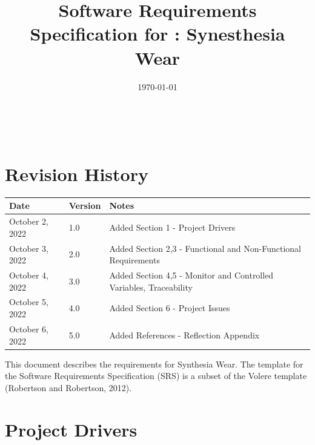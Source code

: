 \documentclass[12pt]{article}
\begin{document}
\title{Software Requirements Specification for \progname: Synesthesia Wear} 
\author{\authname}
\date{\today}
	
\maketitle

~\newpage


\tableofcontents

\pagebreak

\section*{Revision History}

\begin{tabularx}{\textwidth}{p{3cm}p{2cm}X}
\toprule {\bf Date} & {\bf Version} & {\bf Notes}\\
\midrule
October 2, 2022 & 1.0 & Added Section 1 - Project Drivers\\

October 3, 2022 & 2.0 & Added Section 2,3 - Functional and Non-Functional Requirements\\

October 4, 2022 & 3.0 & Added Section 4,5 - Monitor and Controlled Variables, Traceability  \\
October 5, 2022 & 4.0 & Added Section 6 -  Project Issues \\
October 6, 2022 & 5.0 & Added References -  Reflection Appendix \\
\bottomrule
\end{tabularx}

\vspace{5mm}
This document describes the requirements for Synthesia Wear.
The template for the Software Requirements Specification (SRS)
is a subset of the Volere template (Robertson and Robertson, 2012).

\section{Project Drivers}
\end{document}
